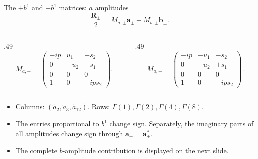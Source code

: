 \begin{frame}{The $+b^1$ and $-b^1$ matrices: $a$ amplitudes}
  \[
    \frac{\boldsymbol R_\pm}{2}
       =M_{a,\pm}\boldsymbol a_\pm+M_{b,\pm}\boldsymbol b_\pm.
  \]
  \begin{columns}[c]
    \begin{column}{.49\textwidth}
      \[M_{a,+}=\begin{pmatrix}
       -ip&u_1&-s_2\\
       0&-u_2&-s_1\\
       0&0&0\\
       1&0&-ip s_2
      \end{pmatrix}.\]
    \end{column}
    \begin{column}{.49\textwidth}
      \[M_{a,-}=\begin{pmatrix}
       -ip&-u_1&-s_2\\
       0&-u_2&+s_1\\
       0&0&0\\
       1&0&-ip s_2
      \end{pmatrix}.\]
    \end{column}
  \end{columns}
  \begin{itemize}
    \item Columns: $(\tilde a_2,\tilde a_3,\tilde a_{12})$. Rows: $\Gamma(1),\Gamma(2),\Gamma(4),\Gamma(8)$.
    \item The entries proportional to $b^1$ change sign. Separately, the imaginary parts of all amplitudes change sign through $\boldsymbol a_-=\boldsymbol a_+^*$.
    \item The complete $b$-amplitude contribution is displayed on the next slide.
  \end{itemize}
\end{frame}

